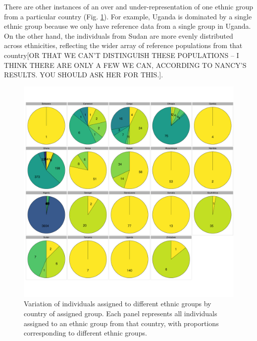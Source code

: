 {There are other instances of an over and under-representation of one ethnic group from a particular country (Fig. \ref{fig:all_countries_SF_props_pie_chart}). For example, Uganda is dominated by a single ethnic group because we only have reference data from a single group in Uganda. On the other hand, the individuals from Sudan are more evenly distributed across ethnicities, {\color{red}reflecting the wider array of reference populations from that country[OR THAT WE CAN'T DISTINGUISH THESE POPULATIONS -- I THINK THERE ARE ONLY A FEW WE CAN, ACCORDING TO NANCY'S RESULTS. YOU SHOULD ASK HER FOR THIS.]}. 

\begin{figure}[htp]
    \centering
    \includegraphics[width=1.0\textwidth]{../images/chapter3/all_countries_SF_props_pie_chart.pdf}
    \caption{Variation of individuals assigned to different ethnic groups by country of assigned group. Each panel represents all individuals assigned to an ethnic group from that country, with proportions corresponding to different ethnic groups.}
    \label{fig:all_countries_SF_props_pie_chart}
\end{figure}

}

